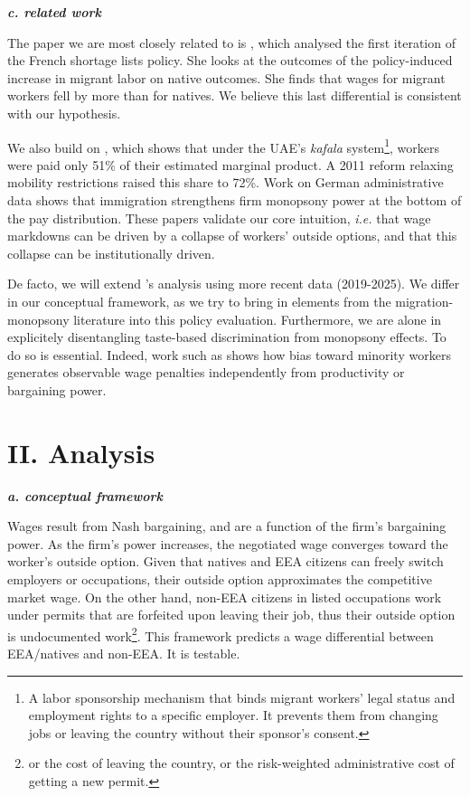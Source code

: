 \documentclass[10pt, a4paper]{article}
\begin{document}
\textbf{\textit{c. related work}}

The paper we are most closely related to is \citet{signorelli2024}, which analysed the first iteration of the French shortage lists policy. She looks at the outcomes of the policy-induced increase in migrant labor on native outcomes. She finds that wages for migrant workers fell by more than for natives. We believe this last differential is consistent with our hypothesis. 

We also build on \citet{naidu2016}, which shows that under the UAE's \textit{kafala} system\footnote{A labor sponsorship mechanism that binds migrant workers' legal status and employment rights to a specific employer. It prevents them from changing jobs or leaving the country without their sponsor's consent.}, workers were paid only 51\% of their estimated marginal product. A 2011 reform relaxing mobility restrictions raised this share to 72\%.  Work on German administrative data \citep{amior2024} shows that immigration strengthens firm monopsony power at the bottom of the pay distribution. These papers validate our core intuition, \textit{i.e.} that wage markdowns can be driven by a collapse of workers' outside options, and that this collapse can be institutionally driven. 

 De facto, we will extend \citet{signorelli2024}'s analysis using more recent data (2019-2025). We differ in our conceptual framework, as we try to bring in elements from the migration-monopsony literature into this policy evaluation. Furthermore, we are alone in explicitely disentangling taste-based discrimination from monopsony effects. To do so is essential. Indeed, work such as \citet{glover2017} shows how bias toward minority workers generates observable wage penalties independently from productivity or bargaining power. \\
 
\section{II. Analysis}
\vspace{0.2cm}

\textbf{\textit{a. conceptual framework}}

Wages result from Nash bargaining, and are a function of the firm's bargaining power. As the firm's power increases, the negotiated wage converges toward the worker's outside option. Given that natives and EEA citizens can freely switch employers or occupations, their outside option approximates the competitive market wage. On the other hand, non-EEA citizens in listed occupations work under permits that are forfeited upon leaving their job, thus their outside option is undocumented work\footnote{or the cost of leaving the country, or the risk-weighted administrative cost of getting a new permit.}. This framework predicts a wage differential between EEA/natives and non-EEA. It is testable. \\
\end{document}

